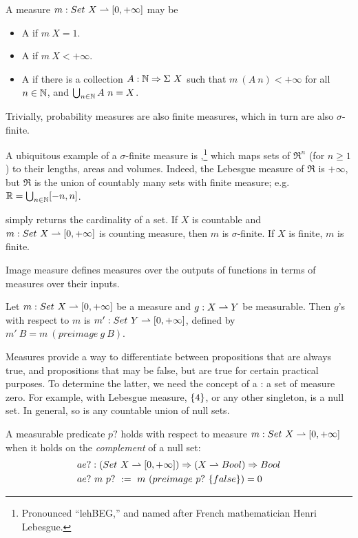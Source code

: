 \begin{definition}
A measure $m : Set~X \rightharpoonup [0,+\infty]$ may be
\begin{itemize}
	\item A  if $m~X = 1$.
	\item A  if $m~X < +\infty$.
	\item A  if there is a collection $A : \mathbb{N} \Rightarrow \Sigma~X$ such that $m~(A~n) < +\infty$ for all $n \in \mathbb{N}$, and $\bigcup_{n \in \mathbb{N}} A~n = X$.
\end{itemize}
Trivially, probability measures are also finite measures, which in turn are also $\sigma$-finite.
\end{definition}

A ubiquitous example of a $\sigma$-finite measure is ,\footnote{Pronounced ``lehBEG,'' and named after French mathematician Henri Lebesgue.} which maps sets of $\Re^n$ (for $n \ge 1$) to their lengths, areas and volumes.
Indeed, the Lebesgue measure of $\Re$ is $+\infty$, but $\Re$ is the union of countably many sets with finite measure; e.g. $\mathbb{R} = \bigcup_{n \in \mathbb{N}} [-n,n]$.

 simply returns the cardinality of a set.
If $X$ is countable and $m : Set~X \rightharpoonup [0,+\infty]$ is counting measure, then $m$ is $\sigma$-finite.
If $X$ is finite, $m$ is finite.

Image measure defines measures over the outputs of functions in terms of measures over their inputs.

\begin{definition}
Let $m : Set~X \rightharpoonup [0,+\infty]$ be a measure and $g : X \rightharpoonup Y$ be measurable.
Then $g$'s  with respect to $m$ is $m' : Set~Y \rightharpoonup [0,+\infty]$, defined by $m'~B = m~(preimage~g~B)$.
\end{definition}

Measures provide a way to differentiate between propositions that are always true, and propositions that may be false, but are true for certain practical purposes.
To determine the latter, we need the concept of a : a set of measure zero.
For example, with Lebesgue measure, $\{{4}\}$, or any other singleton, is a null set.
In general, so is any countable union of null sets.

\begin{definition}
\label{def:almost-everywhere}
A measurable predicate $p?$ holds  with respect to measure $m : Set~X \rightharpoonup [0,+\infty]$ when it holds on the \emph{complement} of a null set:
\begin{equation}
\begin{aligned}
	&ae? : (Set~X \rightharpoonup [0,+\infty]) \Rightarrow (X \rightharpoonup Bool) \Rightarrow Bool \\
	&ae?~m~p?\ :=\ m~(preimage~p?~\{{false}\}) = 0
\end{aligned}
\label{eqn:ae-def}
\end{equation}
\end{definition}

